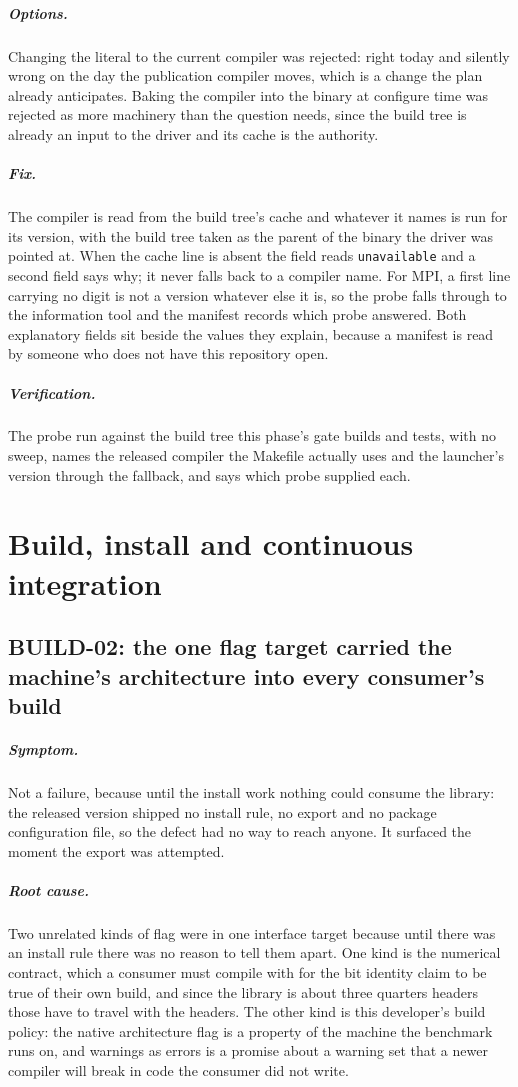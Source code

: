 \documentclass[11pt,a4paper]{report}
\newcommand{\symptom}[1]{\paragraph{Symptom.}#1}
\newcommand{\rootcause}[1]{\paragraph{Root cause.}#1}
\newcommand{\options}[1]{\paragraph{Options.}#1}
\newcommand{\fix}[1]{\paragraph{Fix.}#1}
\newcommand{\verification}[1]{\paragraph{Verification.}#1}
\begin{document}
\options{Changing the literal to the current compiler was rejected: right today
and silently wrong on the day the publication compiler moves, which is a change
the plan already anticipates. Baking the compiler into the binary at configure
time was rejected as more machinery than the question needs, since the build tree
is already an input to the driver and its cache is the authority.}

\fix{The compiler is read from the build tree's cache and whatever it names is
run for its version, with the build tree taken as the parent of the binary the
driver was pointed at. When the cache line is absent the field reads
\texttt{unavailable} and a second field says why; it never falls back to a
compiler name. For MPI, a first line carrying no digit is not a version whatever
else it is, so the probe falls through to the information tool and the manifest
records which probe answered. Both explanatory fields sit beside the values they
explain, because a manifest is read by someone who does not have this repository
open.}

\verification{The probe run against the build tree this phase's gate builds and
tests, with no sweep, names the released compiler the Makefile actually uses and
the launcher's version through the fallback, and says which probe supplied each.}

\chapter{Build, install and continuous integration}

\section{BUILD-02: the one flag target carried the machine's architecture into every consumer's build}

\symptom{Not a failure, because until the install work nothing could consume the
library: the released version shipped no install rule, no export and no package
configuration file, so the defect had no way to reach anyone. It surfaced the
moment the export was attempted.}

\rootcause{Two unrelated kinds of flag were in one interface target because until
there was an install rule there was no reason to tell them apart. One kind is the
numerical contract, which a consumer must compile with for the bit identity claim
to be true of their own build, and since the library is about three quarters
headers those have to travel with the headers. The other kind is this developer's
build policy: the native architecture flag is a property of the machine the
benchmark runs on, and warnings as errors is a promise about a warning set that a
newer compiler will break in code the consumer did not write.}
\end{document}
